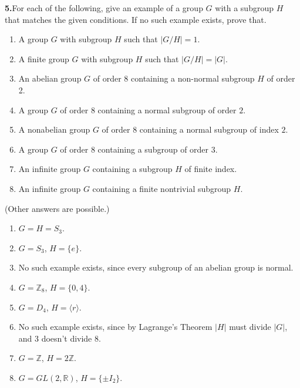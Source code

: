 \documentclass[10pt,]{book}
\theoremstyle{plain}
\theoremstyle{definition}
\theoremstyle{definition}
\theoremstyle{definition}
\theoremstyle{definition}
\numberwithin{equation}{section}
\def\Z{\mathbb{Z}}
\def\R{\mathbb{R}}
\begin{document}
\par\smallskip
\noindent\textbf{5.}\quad{}For each of the following, give an example of a group \(G\) with a subgroup \(H\) that matches the given conditions. If no such example exists, prove that. \leavevmode%
\begin{enumerate}[label=(\alph*)]
\item\hypertarget{li-437}{}A group \(G\) with subgroup \(H\) such that \(|G/H|=1\).%
\item\hypertarget{li-438}{}A finite group \(G\) with subgroup \(H\) such that \(|G/H|=|G|\).%
\item\hypertarget{li-439}{}An abelian group \(G\) of order \(8\) containing a non-normal subgroup \(H\) of order 2.%
\item\hypertarget{li-440}{}A group \(G\) of order 8 containing a normal subgroup of order \(2\).%
\item\hypertarget{li-441}{}A nonabelian group \(G\) of order 8 containing a normal subgroup of index \(2\).%
\item\hypertarget{li-442}{}A group \(G\) of order 8 containing a subgroup of order \(3\).%
\item\hypertarget{li-443}{}An infinite group \(G\) containing a subgroup \(H\) of finite index.%
\item\hypertarget{li-444}{}An infinite group \(G\) containing a finite nontrivial subgroup \(H\).%
\end{enumerate}
%
\par\smallskip
(Other answers are possible.) \leavevmode%
\begin{enumerate}[label=(\alph*)]
\item\hypertarget{li-445}{}\(G=H=S_3\).%
\item\hypertarget{li-446}{}\(G=S_3\), \(H=\{e\}\).%
\item\hypertarget{li-447}{}No such example exists, since every subgroup of an abelian group is normal.%
\item\hypertarget{li-448}{}\(G=\Z_8\), \(H=\{0,4\}\).%
\item\hypertarget{li-449}{}\(G=D_4\), \(H=\langle r\rangle\).%
\item\hypertarget{li-450}{}No such example exists, since by Lagrange's Theorem \(|H|\) must divide \(|G|\), and 3 doesn't divide 8.%
\item\hypertarget{li-451}{}\(G=\Z\), \(H=2\Z\).%
\item\hypertarget{li-452}{}\(G=GL(2,\R)\), \(H=\{\pm I_2\}\).%
\end{enumerate}
\end{document}

